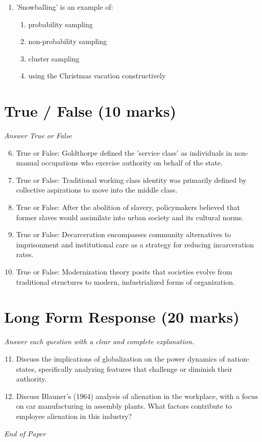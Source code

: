 \documentclass[12pt]{article}
\begin{document}
\begin{enumerate}[label=\arabic*.]
\begin{enumerate}[label=(\alph*)]
    \item a fixed geographical location
    \item collective action based on common interests
\end{enumerate}
\item 'Snowballing' is an example of:
\begin{enumerate}[label=(\alph*)]
    \item probability sampling
    \item non-probability sampling
    \item cluster sampling
    \item using the Christmas vacation constructively
\end{enumerate}
\end{enumerate}

\section*{True / False (10 marks)}
\textit{Answer True or False}
\begin{enumerate}[label=\arabic*.]
\setcounter{enumi}{5}
\item True or False: Goldthorpe defined the 'service class' as individuals in non-manual occupations who exercise authority on behalf of the state.
\item True or False: Traditional working class identity was primarily defined by collective aspirations to move into the middle class.
\item True or False: After the abolition of slavery, policymakers believed that former slaves would assimilate into urban society and its cultural norms.
\item True or False: Decarceration encompasses community alternatives to imprisonment and institutional care as a strategy for reducing incarceration rates.
\item True or False: Modernization theory posits that societies evolve from traditional structures to modern, industrialized forms of organization.
\end{enumerate}

\section*{Long Form Response (20 marks)}
\textit{Answer each question with a clear and complete explanation.}
\begin{enumerate}[label=\arabic*.]
\setcounter{enumi}{10}
\item Discuss the implications of globalization on the power dynamics of nation-states, specifically analyzing features that challenge or diminish their authority.
\item Discuss Blauner's (1964) analysis of alienation in the workplace, with a focus on car manufacturing in assembly plants. What factors contribute to employee alienation in this industry?
\end{enumerate}

\vfill
\noindent\textit{End of Paper}
\end{document}
